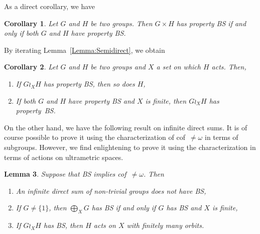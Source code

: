 \documentclass[a4paper]{article}
\newtheorem{lem}{Lemma}[section]
\newtheorem{cor}[lem]{Corollary}
\theoremstyle{definition}
\newtheorem{exmp}[lem]{Example}
\newcommand{\setst}[2]{\{#1\ |\ #2\}}
\begin{document}
%
%
As a direct corollary, we have
\begin{cor}\label{Cor:Prod}
Let $G$ and $H$ be two groups. Then $G\times H$ has property BS if and only if both $G$ and $H$ have property BS.
\end{cor}
%
%
By iterating Lemma~\ref{Lemma:Semidirect}, we obtain
%
%
\begin{cor}\label{Cor:Wreath}
Let $G$ and $H$ be two groups and $X$ a set on which $H$ acts. Then,
\begin{enumerate}
\item
If $G\wr_X H$ has property BS, then so does $H$,
\item
If both $G$ and $H$ have property BS and $X$ is finite, then $G\wr_X H$ has property~BS.
\end{enumerate}
\end{cor}
%
%
On the other hand, we have the following result on infinite direct sums.
It is of course possible to prove it using the characterization of cof~$\neq\omega$ in terms of subgroups. However, we find enlightening to prove it using the characterization in terms of actions on ultrametric spaces.
%
%
\begin{lem}\label{Lemma:Cof}
Suppose that BS implies cof~$\neq\omega$. Then
\begin{enumerate}
\item An infinite direct sum of non-trivial groups does not have BS,
\item If $G\neq\{1\}$, then $\bigoplus_XG$ has BS if and only if $G$ has BS and $X$ is finite,
\item If $G\wr_XH$ has BS, then $H$ acts on $X$ with finitely many orbits.
\end{enumerate}
\end{lem}
\end{document}

